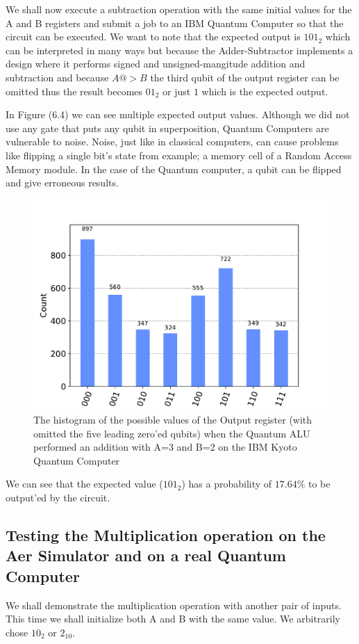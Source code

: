 We shall now execute a subtraction operation with the same initial values for the A and B registers and submit a job to an IBM Quantum Computer
so that the circuit can be executed. We want to note that the expected output is $101_2$ which can be interpreted in many ways but because
the Adder-Subtractor implements a design where it performs signed and unsigned-mangitude addition and subtraction and because $A @> B$ the
third qubit of the output register can be omitted thus the result becomes $01_2$ or just $1$ which is the expected output. 

In Figure (6.4) we can see multiple expected output values. Although we did not use any gate that puts any qubit in superposition, Quantum Computers
are vulnerable to noise. Noise, just like in classical computers, can cause problems like flipping a single bit's state from example; a memory cell
of a Random Access Memory module. In the case of the Quantum computer, a qubit can be flipped and give erroneous results.

\begin{figure}[!ht]
        \centering
        \includegraphics[scale=0.7]{images/6_Complete_System/adder_subtractor_ibmq_result.pdf}
        \caption{The histogram of the possible values of the Output register (with omitted the five leading zero'ed qubits) when the Quantum ALU performed
        an addition with A=3 and B=2 on the IBM Kyoto Quantum Computer}
\end{figure}

We can see that the expected value ($101_2$) has a probability of $17.64\%$ to be output'ed by the circuit.

\newpage
\subsection{Testing the Multiplication operation on the Aer Simulator and on a real Quantum Computer}
We shall demonstrate the multiplication operation with another pair of inputs. This time we shall initialize both A and B with the same value. We
arbitrarily chose $10_2$ or $2_{10}$.

